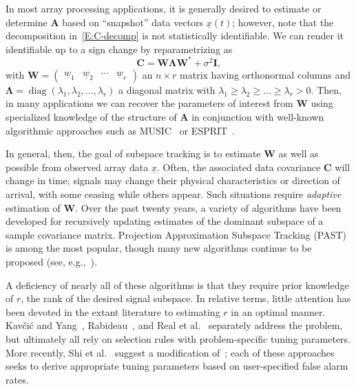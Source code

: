 \documentclass[final]{IEEEtran} %
\newcommand{\vectorsymbol}{\underline}
\newcommand{\matrixsymbol}{\boldsymbol}
\newcommand{\mA}{\matrixsymbol{A}}
\newcommand{\mC}{\matrixsymbol{C}}
\newcommand{\mI}{\matrixsymbol{I}}
\newcommand{\mW}{\matrixsymbol{W}}
\newcommand{\mLambda}{\matrixsymbol{\Lambda}}
\newcommand{\vw}{\vectorsymbol{w}}
\newcommand{\vx}{\vectorsymbol{x}}
\DeclareMathOperator*{\diag}{diag}
\begin{document}
In most array processing applications, it is generally desired to estimate or determine $\mA$ based on ``snapshot'' data vectors $\vx(t)$; however, note that the decomposition in~\eqref{E:C-decomp} is not statistically identifiable.  We can render it identifiable up to a sign change by reparametrizing as
\begin{equation}\label{E:C-decomp-eig}
    \mC
    =
    \mW \mLambda \mW^* + \sigma^2 \mI,
\end{equation}
with
\(
    \mW
    =
    \left(
    \begin{matrix}
        \vw_1 & \vw_2 & \cdots & \vw_r
    \end{matrix}
    \right)
\)
an $n \times r$ matrix having orthonormal columns and
\(
    \mLambda
    =
    \diag(
        \lambda_1, \lambda_2, \ldots, \lambda_r
    )
\)
a diagonal matrix with
\(
    \lambda_1 \geq \lambda_2 \geq \dots \geq \lambda_r > 0.
\)
Then, in many applications we can recover the parameters of interest from
$\mW$ using specialized knowledge of the structure of $\mA$ in conjunction with well-known algorithmic approaches
such as MUSIC~\cite{schmidt1986mel} or ESPRIT~\cite{roy1989ees}.

In general, then, the goal of subspace tracking is to estimate $\mW$ as well as
possible from observed array data $\vx$.  Often, the associated data covariance $\mC$ will change in time; signals may change their physical characteristics or direction of arrival, with some ceasing while others appear.  Such situations require \emph{adaptive} estimation of $\mW$.  Over the past twenty years, a variety of algorithms
have been developed for recursively updating estimates of the dominant subspace
of a sample covariance matrix.  Projection Approximation Subspace Tracking (PAST)~\cite{yang1995pas} is among the most popular, though many new algorithms continue to be proposed (see, e.g.,~\cite{badeau2008fas, bartelmaos2008fpc, doukopoulos2008fas}).

A deficiency of nearly all of these algorithms is that they require prior
knowledge of $r$, the rank of the desired signal subspace.  In relative terms, little
attention has been devoted in the extant literature to estimating $r$ in an optimal manner.  Kav\v{c}i\'c and Yang~\cite{kavcic1996are}, Rabideau~\cite{rabideau1996fra}, and Real et al.~\cite{real1999taf} separately address the problem, but ultimately all
rely on selection rules with problem-specific tuning parameters.  More recently,
Shi et al.~\cite{shi2007aen} suggest a modification of~\cite{rabideau1996fra}; each of these approaches seeks to derive appropriate tuning parameters based on
user-specified false alarm rates.
\end{document}
